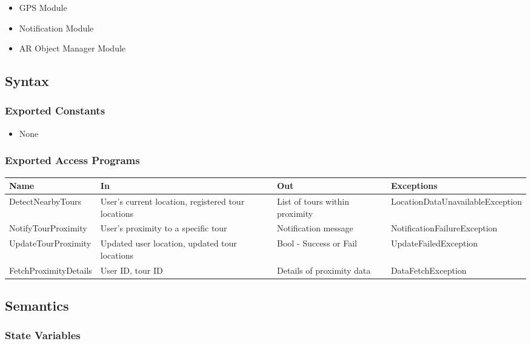 \documentclass[12pt, titlepage]{article}
\begin{document}
\begin{itemize}
    \item GPS Module
    \item Notification Module
    \item AR Object Manager Module
\end{itemize}

\subsection{Syntax}

\subsubsection{Exported Constants}

\begin{itemize}
    \item None
\end{itemize}

\subsubsection{Exported Access Programs}

\begin{center}
\begin{tabular}{p{4cm} p{3cm} p{3cm} p{5cm}}
\hline
\textbf{Name} & \textbf{In} & \textbf{Out} & \textbf{Exceptions} \\
\hline
DetectNearbyTours & User’s current location, registered tour locations & List of tours within proximity & LocationDataUnavailableException \\
\hline
NotifyTourProximity & User’s proximity to a specific tour & Notification message & NotificationFailureException \\
\hline
UpdateTourProximity & Updated user location, updated tour locations & Bool - Success or Fail & UpdateFailedException \\
\hline
FetchProximityDetails & User ID, tour ID & Details of proximity data & DataFetchException \\
\hline
\end{tabular}
\end{center}


\subsection{Semantics}

\subsubsection{State Variables}
\end{document}

